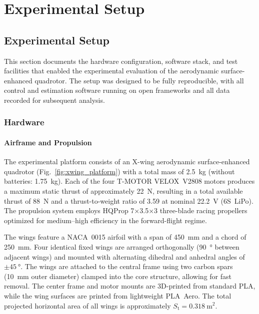 
\chapter{Experimental Setup}\label{chapter:experimental-setup}

\section{Experimental Setup}
\label{sec:experimental_setup}

This section documents the hardware configuration, software stack, and test facilities that enabled the experimental evaluation of the aerodynamic surface-enhanced quadrotor. The setup was designed to be fully reproducible, with all control and estimation software running on open frameworks and all data recorded for subsequent analysis.

\subsection{Hardware}

\subsubsection{Airframe and Propulsion}
The experimental platform consists of an X-wing aerodynamic surface-enhanced quadrotor (Fig.~\ref{fig:xwing_platform}) with a total mass of \SI{2.5}{\kilogram} (without batteries: \SI{1.75}{\kilogram}). Each of the four T-MOTOR VELOX~V2808 motors produces a maximum static thrust of approximately \SI{22}{\newton}, resulting in a total available thrust of \SI{88}{\newton} and a thrust-to-weight ratio of 3.59 at nominal \SI{22.2}{\volt} (6S~LiPo). The propulsion system employs HQProp 7×3.5×3 three-blade racing propellers optimized for medium–high efficiency in the forward-flight regime.

The wings feature a NACA~0015 airfoil with a span of \SI{450}{\milli\meter} and a chord of \SI{250}{\milli\meter}. Four identical fixed wings are arranged orthogonally (\SI{90}{\degree} between adjacent wings) and mounted with alternating dihedral and anhedral angles of $\pm\SI{45}{\degree}$. The wings are attached to the central frame using two carbon spars (\SI{10}{\milli\meter} outer diameter) clamped into the core structure, allowing for fast removal. The center frame and motor mounts are 3D-printed from standard PLA, while the wing surfaces are printed from lightweight PLA~Aero. The total projected horizontal area of all wings is approximately $S_\mathrm{t} = 0.318~\si{\meter\squared}$.


